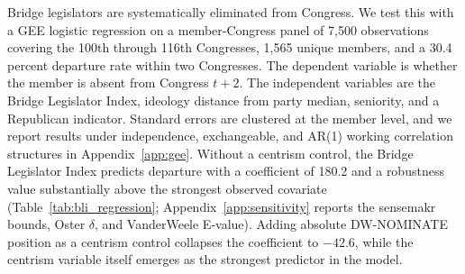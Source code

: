 \documentclass[12pt, a4paper]{article}
\begin{document}
Bridge legislators are systematically eliminated from Congress. We test this with a GEE logistic regression on a member-Congress panel of 7,500 observations covering the 100th through 116th Congresses, 1,565 unique members, and a 30.4 percent departure rate within two Congresses. The dependent variable is whether the member is absent from Congress $t+2$. The independent variables are the Bridge Legislator Index, ideology distance from party median, seniority, and a Republican indicator. Standard errors are clustered at the member level, and we report results under independence, exchangeable, and AR(1) working correlation structures in Appendix~\ref{app:gee}. Without a centrism control, the Bridge Legislator Index predicts departure with a coefficient of 180.2 and a robustness value substantially above the strongest observed covariate (Table~\ref{tab:bli_regression}; Appendix~\ref{app:sensitivity} reports the sensemakr bounds, Oster $\delta$, and VanderWeele E-value). Adding absolute DW-NOMINATE position as a centrism control collapses the coefficient to $-42.6$, while the centrism variable itself emerges as the strongest predictor in the model.
\end{document}
